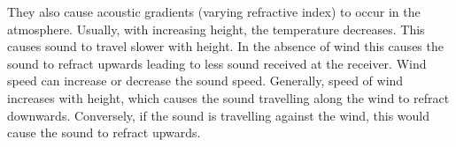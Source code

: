 They also cause acoustic gradients (varying refractive index) to occur in the atmosphere. Usually, with increasing height, the temperature decreases. This causes sound to travel slower with height. In the absence of wind this causes the sound to refract upwards leading to less sound received at the receiver. Wind speed can increase or decrease the sound speed. Generally, speed of wind increases with height, which causes the sound travelling along the wind to refract downwards. Conversely, if the sound is travelling against the wind, this would cause the sound to refract upwards.
